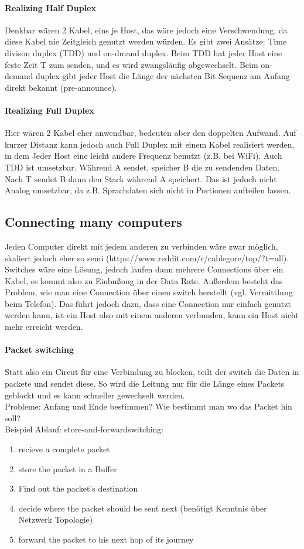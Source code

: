         \paragraph{Realizing Half Duplex}
        Denkbar wären 2 Kabel, eins je Host, das wäre jedoch eine Verschwendung, da diese Kabel nie Zeitgleich genutzt werden würden. Es gibt zwei Ansätze: Time divison duplex (TDD) und on-dmand duplex. Beim TDD hat jeder Host eine feste Zeit T zum senden, und es wird zwangsläufig abgewechselt. Beim on-demand duplex gibt jeder Host die Länge der nächsten Bit Sequenz am Anfang direkt bekannt (pre-announce). 
    \paragraph{Realizing Full Duplex}
        Hier wären 2 Kabel eher anwendbar, bedeuten aber den doppelten Aufwand. Auf kurzer Distanz kann jedoch auch Full Duplex mit einem Kabel realisiert werden, in dem Jeder Host eine leicht andere Frequenz benutzt (z.B. bei WiFi). Auch TDD ist umsetzbar. Während A sendet, speicher B die zu sendenden Daten. Nach T sendet B dann den Stack während A speichert. Das ist jedoch nicht Analog umsetzbar, da z.B. Sprachdaten sich nicht in Portionen aufteilen lassen. 

\subsection{Connecting many computers}
    Jeden Computer direkt mit jedem anderen zu verbinden wäre zwar möglich, skaliert jedoch eher so semi (https://www.reddit.com/r/cablegore/top/?t=all). Switches wäre eine Lösung, jedoch laufen dann mehrere Connections über ein Kabel, es kommt also zu Einbußung in der Data Rate. Außerdem besteht das Problem, wie man eine Connection über einen switch herstellt (vgl. Vermittlung beim Telefon). Das führt jedoch dazu, dass eine Connection nur einfach genutzt werden kann, ist ein Host also mit einem anderen verbunden, kann ein Host nicht mehr erreicht werden. 
    \paragraph{Packet switching}
        Statt also ein Circut für eine Verbindung zu blocken, teilt der switch die Daten in packete und sendet diese. So wird die Leitung nur für die Länge eines Packets geblockt und es kann schneller gewechselt werden. \\
        Probleme: Anfang und Ende bestimmen? Wie bestimmt man wo das Packet hin soll? \\ Beispiel Ablauf: \frQuo store-and-forward\frQuc switching: 
        \begin{enumerate}
            \item recieve a complete packet
            \item store the packet in a Buffer
            \item Find out the packet's destination
            \item decide where the packet should be sent next (benötigt Kenntnis über Netzwerk Topologie)
            \item forward the packet to his next hop of its journey
        \end{enumerate}
